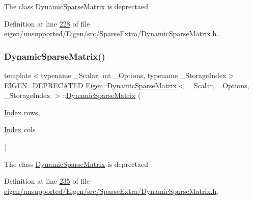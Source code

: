 The class \hyperlink{class_eigen_1_1_dynamic_sparse_matrix}{Dynamic\+Sparse\+Matrix} is deprectaed 

Definition at line \hyperlink{eigen_2unsupported_2_eigen_2src_2_sparse_extra_2_dynamic_sparse_matrix_8h_source_l00228}{228} of file \hyperlink{eigen_2unsupported_2_eigen_2src_2_sparse_extra_2_dynamic_sparse_matrix_8h_source}{eigen/unsupported/\+Eigen/src/\+Sparse\+Extra/\+Dynamic\+Sparse\+Matrix.\+h}.

\mbox{\label{class_eigen_1_1_dynamic_sparse_matrix_ad1c810ff3cfcc97db704d26b9d114f94}} 
\subsubsection{\texorpdfstring{Dynamic\+Sparse\+Matrix()}{DynamicSparseMatrix()}\hspace{0.1cm}{\footnotesize\ttfamily [2/6]}}
{\footnotesize\ttfamily template$<$typename \+\_\+\+Scalar, int \+\_\+\+Options, typename \+\_\+\+Storage\+Index$>$ \\
E\+I\+G\+E\+N\+\_\+\+D\+E\+P\+R\+E\+C\+A\+T\+ED \hyperlink{class_eigen_1_1_dynamic_sparse_matrix}{Eigen\+::\+Dynamic\+Sparse\+Matrix}$<$ \+\_\+\+Scalar, \+\_\+\+Options, \+\_\+\+Storage\+Index $>$\+::\hyperlink{class_eigen_1_1_dynamic_sparse_matrix}{Dynamic\+Sparse\+Matrix} (\begin{DoxyParamCaption}\item[{\hyperlink{group___core___module_a554f30542cc2316add4b1ea0a492ff02}{Index}}]{rows,  }\item[{\hyperlink{group___core___module_a554f30542cc2316add4b1ea0a492ff02}{Index}}]{cols }\end{DoxyParamCaption})\hspace{0.3cm}{\ttfamily [inline]}}

The class \hyperlink{class_eigen_1_1_dynamic_sparse_matrix}{Dynamic\+Sparse\+Matrix} is deprectaed 

Definition at line \hyperlink{eigen_2unsupported_2_eigen_2src_2_sparse_extra_2_dynamic_sparse_matrix_8h_source_l00235}{235} of file \hyperlink{eigen_2unsupported_2_eigen_2src_2_sparse_extra_2_dynamic_sparse_matrix_8h_source}{eigen/unsupported/\+Eigen/src/\+Sparse\+Extra/\+Dynamic\+Sparse\+Matrix.\+h}.

